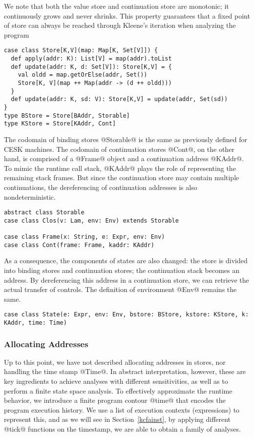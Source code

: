\documentclass[acmsmall]{acmart}\settopmatter{}
\begin{document}
We note that both the value store and continuation store are monotonic;
it continuously grows and never shrinks. This property guarantees that
a fixed point of store can always be reached through Kleene's
iteration when analyzing the program

\begin{lstlisting}
case class Store[K,V](map: Map[K, Set[V]]) {
  def apply(addr: K): List[V] = map(addr).toList
  def update(addr: K, d: Set[V]): Store[K,V] = {
    val oldd = map.getOrElse(addr, Set())
    Store[K, V](map ++ Map(addr -> (d ++ oldd)))
  }
  def update(addr: K, sd: V): Store[K,V] = update(addr, Set(sd))
}
type BStore = Store[BAddr, Storable]
type KStore = Store[KAddr, Cont]
\end{lstlisting}

The codomain of binding stores @Storable@ is the same as previously defined for CESK machines.
The codomain of continuation stores @Cont@, on the other hand, is comprised of
a @Frame@ object and a continuation address @KAddr@.
To mimic the runtime call stack, @KAddr@ plays the role of
representing the remaining stack frames.
But since the continuation store may contain multiple continuations,
the dereferencing of continuation addresses is also nondeterministic.

\begin{lstlisting}
abstract class Storable
case class Clos(v: Lam, env: Env) extends Storable

case class Frame(x: String, e: Expr, env: Env)
case class Cont(frame: Frame, kaddr: KAddr)
\end{lstlisting}

As a consequence, the components of states are also changed:
the store is divided into binding stores and continuation stores;
the continuation stack becomes an address.
By dereferencing this address in a continuation store, we can retrieve the
actual transfer of controls. The definition of environment @Env@
remains the same.

\begin{lstlisting}
case class State(e: Expr, env: Env, bstore: BStore, kstore: KStore, k: KAddr, time: Time)
\end{lstlisting}

\subsubsection{Allocating Addresses}
Up to this point, we have not described allocating addresses in stores,
nor handling the time stamp @Time@.
In abstract interpretation, however, these are key ingredients to achieve
analyses with different sensitivities, as well as to perform a finite
state space analysis\cite{Gilray:2016:ACP:2951913.2951936}.
To effectively approximate the runtime behavior, we introduce a finite
program contour @time@ that encodes the program execution history.
We use a list of execution contexts (expressions) to represent this, and
as we will see in Section~\ref{kcfainst}, by applying different @tick@
functions on the timestamp, we are able to obtain a family of analyses.
\end{document}
